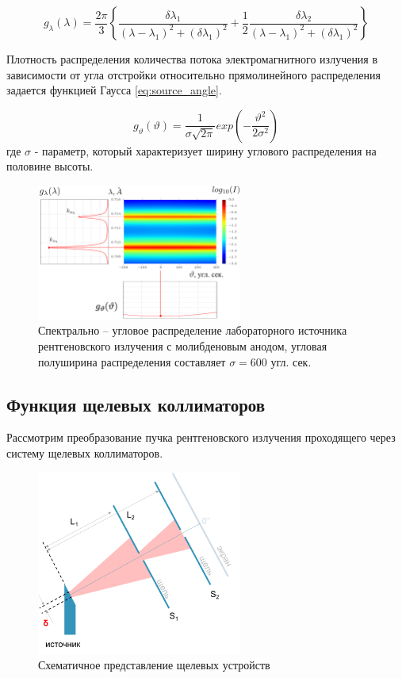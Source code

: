  \begin{equation} \label{eq:source_spectral}
   g_{\lambda} (\lambda) = \frac{2\pi}{3}  \left \{ \frac{\delta\lambda_1}{(\lambda - \lambda_1)^2+
   (\delta \lambda_1)^2} + \frac{1}{2} \frac{\delta\lambda_2}{(\lambda-\lambda_1)^2+(\delta\lambda_1)^2} \right \}
  \end{equation}

  Плотность распределения количества потока электромагнитного излучения в зависимости от угла
  отстройки относительно прямолинейного распределения задается функцией Гаусса \ref{eq:source_angle}.

  \begin{equation} \label{eq:source_angle}
    g_{\vartheta} (\vartheta) = \frac{1}{\sigma \sqrt{ 2\pi}} exp  ( -\frac{\vartheta^2}{2\sigma^2} )
   \end{equation}
где $\sigma$ - параметр, который характеризует ширину углового распределения на половине высоты.

\begin{figure}[H]
  \centering
  \includegraphics[width=0.6\textwidth]{images/source_distrubition.png}
  \caption{Спектрально – угловое распределение лабораторного источника рентгеновского
   излучения с молибденовым анодом, угловая полуширина распределения составляет $\sigma = 600$ угл. сек. }
  \label{ris:source_distrubition}
\end{figure}


 \subsection{Функция щелевых коллиматоров}
 Рассмотрим преобразование пучка рентгеновского излучения проходящего через систему щелевых коллиматоров.
 \begin{figure}[H]
   \centering
   \includegraphics[width=0.6\textwidth]{images/for_slits.png}
   \caption{Схематичное представление щелевых устройств}
   \label{ris:for_slits}
 \end{figure}

